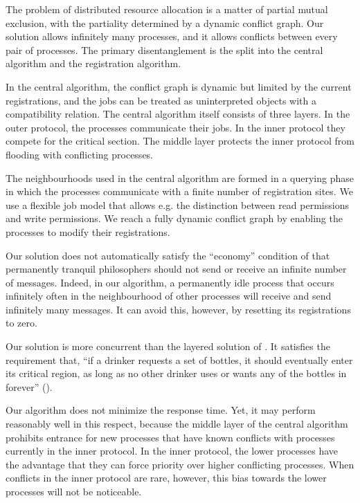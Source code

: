 \documentclass[10pt]{article} \usepackage[english]{babel}
\begin{document}
The problem of distributed resource allocation is a matter of partial
mutual exclusion, with the partiality determined by a dynamic conflict
graph.  Our solution allows infinitely many processes, and it allows
conflicts between every pair of processes.  The primary
disentanglement is the split into the central algorithm and the
registration algorithm.

In the central algorithm, the conflict graph is dynamic but limited by
the current registrations, and the jobs can be treated as
uninterpreted objects with a compatibility relation.  The central
algorithm itself consists of three layers.  In the outer protocol, the
processes communicate their jobs.  In the inner protocol they compete
for the critical section.  The middle layer protects the inner
protocol from flooding with conflicting processes.

The neighbourhoods used in the central algorithm are formed in a
querying phase in which the processes communicate with a finite number
of registration sites.  We use a flexible job model that allows e.g.
the distinction between read permissions and write permissions.  We
reach a fully dynamic conflict graph by enabling the processes to
modify their registrations.

Our solution does not automatically satisfy the ``economy'' condition
of \cite{ChM84} that permanently tranquil philosophers should not send
or receive an infinite number of messages. Indeed, in our algorithm, a
permanently idle process that occurs infinitely often in the
neighbourhood of other processes will receive and send infinitely many
messages.  It can avoid this, however, by resetting its registrations
to zero.

Our solution is more concurrent than the layered solution of
\cite{WeL93}. It satisfies the requirement that, ``if a drinker
requests a set  of bottles, it should eventually enter its critical
region, as long as no other drinker uses or wants any of the bottles
in  forever'' (\cite[p.\ 243]{WeL93}).

Our algorithm does not minimize the response time.  Yet, it may
perform reasonably well in this respect, because the middle layer of
the central algorithm prohibits entrance for new processes that have
known conflicts with processes currently in the inner protocol.  In
the inner protocol, the lower processes have the advantage that they
can force priority over higher conflicting processes.  When conflicts
in the inner protocol are rare, however, this bias towards the lower
processes will not be noticeable.
\end{document}

